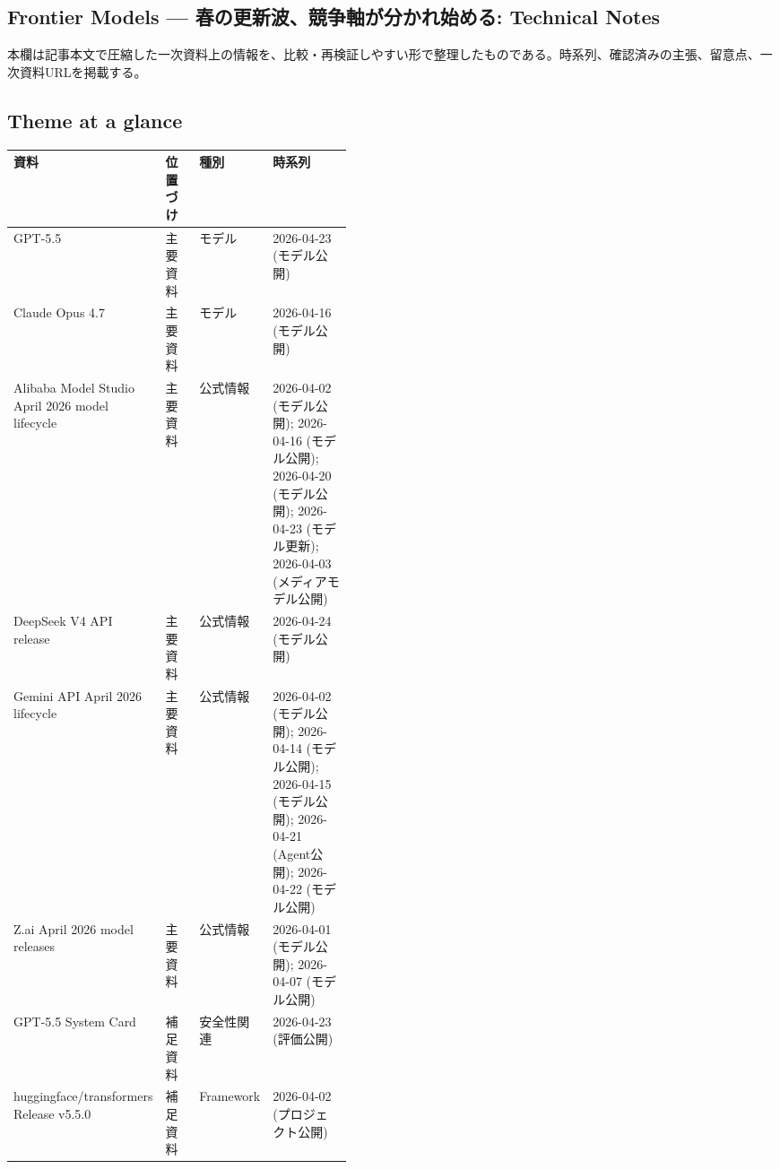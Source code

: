 \subsection*{Frontier Models — 春の更新波、競争軸が分かれ始める: Technical Notes}
本欄は記事本文で圧縮した一次資料上の情報を、比較・再検証しやすい形で整理したものである。時系列、確認済みの主張、留意点、一次資料URLを掲載する。
\medskip
\subsection*{Theme at a glance}
\begin{center}
\footnotesize
\begin{tabularx}{\linewidth}{@{}p{0.20\linewidth}p{0.10\linewidth}p{0.14\linewidth}X@{}}
\toprule
資料 & 位置づけ & 種別 & 時系列 \\
\midrule
GPT-5.5 & 主要資料 & モデル & 2026-04-23 (モデル公開) \\
Claude Opus 4.7 & 主要資料 & モデル & 2026-04-16 (モデル公開) \\
Alibaba Model Studio April 2026 model lifecycle & 主要資料 & 公式情報 & 2026-04-02 (モデル公開); 2026-04-16 (モデル公開); 2026-04-20 (モデル公開); 2026-04-23 (モデル更新); 2026-04-03 (メディアモデル公開) \\
DeepSeek V4 API release & 主要資料 & 公式情報 & 2026-04-24 (モデル公開) \\
Gemini API April 2026 lifecycle & 主要資料 & 公式情報 & 2026-04-02 (モデル公開); 2026-04-14 (モデル公開); 2026-04-15 (モデル公開); 2026-04-21 (Agent公開); 2026-04-22 (モデル公開) \\
Z.ai April 2026 model releases & 主要資料 & 公式情報 & 2026-04-01 (モデル公開); 2026-04-07 (モデル公開) \\
GPT-5.5 System Card & 補足資料 & 安全性関連 & 2026-04-23 (評価公開) \\
huggingface/transformers Release v5.5.0 & 補足資料 & Framework & 2026-04-02 (プロジェクト公開) \\
\bottomrule
\end{tabularx}
\end{center}
\normalsize

